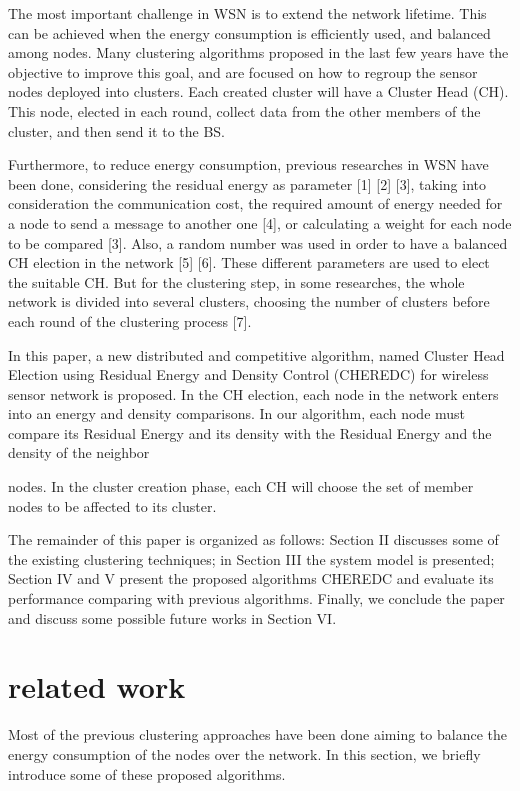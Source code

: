 \documentclass[12 pt]{report}
\begin{document}
\qquad 
The most important challenge in WSN is to extend the
network lifetime. This can be achieved when the energy
consumption is efficiently used, and balanced among nodes.
Many clustering algorithms proposed in the last few years
have the objective to improve this goal, and are focused on
how to regroup the sensor nodes deployed into clusters. Each
created cluster will have a Cluster Head (CH). This node,
elected in each round, collect data from the other members of
the cluster, and then send it to the BS.

\qquad 
Furthermore, to reduce energy consumption, previous
researches in WSN have been done, considering the residual
energy as parameter [1] [2] [3], taking into consideration the
communication cost, the required amount of energy needed for
a node to send a message to another one [4], or calculating a
weight for each node to be compared [3]. Also, a random
number was used in order to have a balanced CH election in
the network [5] [6]. These different parameters are used to
elect the suitable CH. But for the clustering step, in some
researches, the whole network is divided into several clusters,
choosing the number of clusters before each round of the
clustering process [7].

\qquad 
In this paper, a new distributed and competitive algorithm,
named Cluster Head Election using Residual Energy and
Density Control (CHEREDC) for wireless sensor network is
proposed. In the CH election, each node in the network enters
into an energy and density comparisons. In our algorithm,
each node must compare its Residual Energy and its density
with the Residual Energy and the density of the neighbor

nodes. In the cluster creation phase, each CH will choose the
set of member nodes to be affected to its cluster.

\qquad 
The remainder of this paper is organized as follows: Section
II discusses some of the existing clustering techniques; in
Section III the system model is presented; Section IV and V
present the proposed algorithms CHEREDC and evaluate its
performance comparing with previous algorithms. Finally, we
conclude the paper and discuss some possible future works in
Section VI.
\chapter{related work}
\qquad
Most of the previous clustering approaches have been done
aiming to balance the energy consumption of the nodes over
the network. In this section, we briefly introduce some of these
proposed algorithms.
\end{document}
